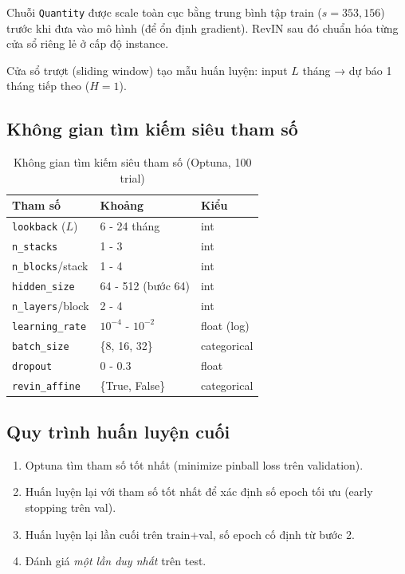 \documentclass[12pt, a4paper]{report}
\begin{document}
Chuỗi \texttt{Quantity} được scale toàn cục bằng trung bình tập train ($s = 353{,}156$) trước khi đưa vào mô hình (để ổn định gradient). RevIN sau đó chuẩn hóa từng cửa sổ riêng lẻ ở cấp độ instance.

Cửa sổ trượt (sliding window) tạo mẫu huấn luyện: input $L$ tháng → dự báo 1 tháng tiếp theo ($H=1$).

\subsection{Không gian tìm kiếm siêu tham số}

\begin{table}[H]
\centering
\caption{Không gian tìm kiếm siêu tham số (Optuna, 100 trial)}
\label{tab:search}
\begin{tabular}{|l|l|l|}
\hline
Tham số & Khoảng & Kiểu \\
\hline
\texttt{lookback} ($L$)       & 6 - 24 tháng          & int \\
\texttt{n\_stacks}             & 1 - 3                  & int \\
\texttt{n\_blocks}/stack       & 1 - 4                  & int \\
\texttt{hidden\_size}          & 64 - 512 (bước 64)     & int \\
\texttt{n\_layers}/block       & 2 - 4                  & int \\
\texttt{learning\_rate}        & $10^{-4}$ - $10^{-2}$  & float (log) \\
\texttt{batch\_size}           & \{8, 16, 32\}           & categorical \\
\texttt{dropout}               & 0 - 0.3                & float \\
\texttt{revin\_affine}         & \{True, False\}         & categorical \\
\hline
\end{tabular}
\end{table}

\subsection{Quy trình huấn luyện cuối}

\begin{enumerate}
  \item Optuna tìm tham số tốt nhất (minimize pinball loss trên validation).
  \item Huấn luyện lại với tham số tốt nhất để xác định số epoch tối ưu (early stopping trên val).
  \item Huấn luyện lại lần cuối trên train+val, số epoch cố định từ bước 2.
  \item Đánh giá \textit{một lần duy nhất} trên test.
\end{enumerate}
\end{document}
